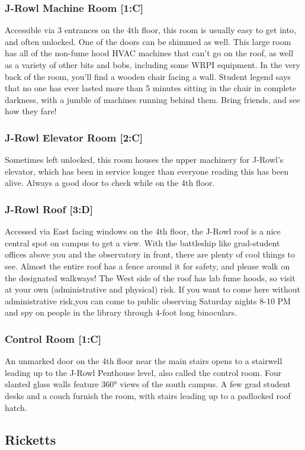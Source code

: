 \documentclass{article}
\begin{document}
\subsubsection{J-Rowl Machine Room [1:C]}
Accessible via 3 entrances on the 4th floor, this room is usually easy to get into, and often unlocked. One of the doors can be shimmed as well. This large room has all of the non-fume hood HVAC machines that can’t go on the roof, as well as a variety of other bits and bobs, including some WRPI equipment. In the very back of the room, you’ll find a wooden chair facing a wall. Student legend says that no one has ever lasted more than 5 minutes sitting in the chair in complete darkness, with a jumble of machines running behind them. Bring friends, and see how they fare!

 \subsubsection{J-Rowl Elevator Room [2:C]}
Sometimes left unlocked, this room houses the upper machinery for J-Rowl’s elevator, which has been in service longer than everyone reading this has been alive. Always a good door to check while on the 4th floor.
\subsubsection{J-Rowl Roof [3:D]}
Accessed via East facing windows on the 4th floor, the J-Rowl roof is a nice central spot on campus to get a view. With the battleship like grad-student offices above you and the observatory in front, there are plenty of cool things to see. Almost the entire roof has a fence around it for safety, and please walk on the designated walkways! The West side of the roof has lab fume hoods, so visit at your own (administrative and physical) risk. If you want to come here without administrative risk,you can come to public observing Saturday nights 8-10 PM and spy on people in the library through 4-foot long binoculars.
\subsubsection{Control Room [1:C]}
An unmarked door on the 4th floor near the main stairs opens to a stairwell leading up to the J-Rowl Penthouse level, also called the control room. Four slanted glass walls feature 360° views of the south campus. A few grad student desks and a couch furnish the room, with stairs leading up to a padlocked roof hatch.
\pagebreak
\subsection{Ricketts}
\end{document}
